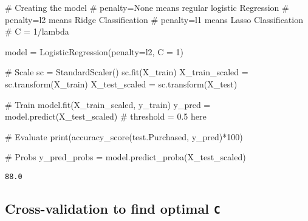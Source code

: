 \documentclass[
  letterpaper,
  DIV=11,
  numbers=noendperiod]{scrreprt}
\newenvironment{Shaded}{\begin{snugshade}}{\end{snugshade}}
\newcommand{\BuiltInTok}[1]{\textcolor[rgb]{0.00,0.23,0.31}{#1}}
\newcommand{\CommentTok}[1]{\textcolor[rgb]{0.37,0.37,0.37}{#1}}
\newcommand{\DecValTok}[1]{\textcolor[rgb]{0.68,0.00,0.00}{#1}}
\newcommand{\NormalTok}[1]{\textcolor[rgb]{0.00,0.23,0.31}{#1}}
\newcommand{\OperatorTok}[1]{\textcolor[rgb]{0.37,0.37,0.37}{#1}}
\newcommand{\StringTok}[1]{\textcolor[rgb]{0.13,0.47,0.30}{#1}}
\begin{document}
\begin{Shaded}
\begin{Highlighting}[]
\CommentTok{\# Creating the model}
    \CommentTok{\# penalty=None means regular logistic Regression}
    \CommentTok{\# penalty=l2 means Ridge Classification}
    \CommentTok{\# penalty=l1 means Lasso Classification}
    \CommentTok{\# C = 1/lambda}
    
\NormalTok{model }\OperatorTok{=}\NormalTok{ LogisticRegression(penalty}\OperatorTok{=}\StringTok{\textquotesingle{}l2\textquotesingle{}}\NormalTok{, C }\OperatorTok{=} \DecValTok{1}\NormalTok{)}
\end{Highlighting}
\end{Shaded}

\begin{Shaded}
\begin{Highlighting}[]
\CommentTok{\# Scale}
\NormalTok{sc }\OperatorTok{=}\NormalTok{ StandardScaler()}
\NormalTok{sc.fit(X\_train)}
\NormalTok{X\_train\_scaled }\OperatorTok{=}\NormalTok{ sc.transform(X\_train)}
\NormalTok{X\_test\_scaled }\OperatorTok{=}\NormalTok{ sc.transform(X\_test)}

\CommentTok{\# Train}
\NormalTok{model.fit(X\_train\_scaled, y\_train)}
\NormalTok{y\_pred }\OperatorTok{=}\NormalTok{ model.predict(X\_test\_scaled) }\CommentTok{\# threshold = 0.5 here}

\CommentTok{\# Evaluate}
\BuiltInTok{print}\NormalTok{(accuracy\_score(test.Purchased, y\_pred)}\OperatorTok{*}\DecValTok{100}\NormalTok{)}

\CommentTok{\# Probs}
\NormalTok{y\_pred\_probs }\OperatorTok{=}\NormalTok{ model.predict\_proba(X\_test\_scaled)}
\end{Highlighting}
\end{Shaded}

\begin{verbatim}
88.0
\end{verbatim}

\subsection{\texorpdfstring{Cross-validation to find optimal
\texttt{C}}{Cross-validation to find optimal C}}\label{cross-validation-to-find-optimal-c}
\end{document}
